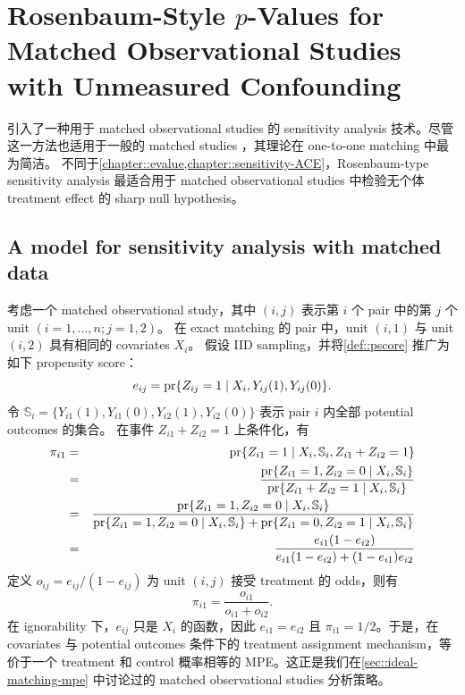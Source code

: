 
\chapter{Rosenbaum-Style $p$-Values for Matched Observational Studies with Unmeasured Confounding}
\label{sec::rosenbaum-sensitivity-analysis}


\citet{rosenbaum1987sensitivity} 引入了一种用于 matched observational studies 的 sensitivity analysis 技术。尽管这一方法也适用于一般的 matched studies \citep{rosenbaum2002design}，其理论在 one-to-one matching 中最为简洁。
不同于\cref{chapter::evalue,chapter::sensitivity-ACE}，Rosenbaum-type sensitivity analysis 最适合用于 matched observational studies 中检验无个体 treatment effect 的 sharp null hypothesis。


\section{A model for sensitivity analysis with matched data}


考虑一个 matched observational study，其中 $(i,j)$ 表示第 $i$ 个 pair 中的第 $j$ 个 unit $(i=1,\ldots, n; j=1,2)$。
在 exact matching 的 pair 中，unit $(i,1)$ 与 unit $(i,2)$ 具有相同的 covariates $X_i$。
假设 IID sampling，并将\cref{def::pscore} 推广为如下 propensity score：
$$
e_{ij} = \textup{pr}\{  Z_{ij} = 1\mid X_i, Y_{ij}(1), Y_{ij}(0) \} .
$$
令 $\mathbb{S}_i = \{Y_{i1}(1), Y_{i1}(0), Y_{i2}(1), Y_{i2}(0)\}$ 表示 pair $i$ 内全部 potential outcomes 的集合。
在事件 $Z_{i1} + Z_{i2} = 1$ 上条件化，有
\begin{eqnarray*}
\pi_{i1} &=& \textup{pr}\{ Z_{i1} = 1 \mid X_i, \mathbb{S}_i, Z_{i1} + Z_{i2} = 1 \} \\
&=& \frac{ \textup{pr}\{ Z_{i1} = 1, Z_{i2} = 0  \mid X_i, \mathbb{S}_i \} }
{ \textup{pr}\{ Z_{i1} + Z_{i2} = 1 \mid X_i, \mathbb{S}_i \} } \\
&=& \frac{ \textup{pr}\{ Z_{i1} = 1, Z_{i2} = 0  \mid X_i, \mathbb{S}_i \} }{ 
\textup{pr}\{ Z_{i1} = 1, Z_{i2} = 0 \mid X_i, \mathbb{S}_i \} + \textup{pr}\{ Z_{i1} = 0, Z_{i2} = 1 \mid X_i, \mathbb{S}_i \}
}\\
&=& \frac{  e_{i1} (1-e_{i2}) }{ e_{i1} (1-e_{i2}) + (1-e_{i1}) e_{i2}} 
\end{eqnarray*}
定义 $o_{ij} = e_{ij} / (1 - e_{ij})$ 为 unit $(i,j)$ 接受 treatment 的 odds，则有
$$
\pi_{i1}  = \frac{o_{i1}}{  o_{i1} + o_{i2} } . 
$$
在 ignorability 下，$e_{ij}$ 只是 $X_i$ 的函数，因此 $e_{i1} = e_{i2}$ 且 $\pi_{i1} = 1/2$。于是，在 covariates 与 potential outcomes 条件下的 treatment assignment mechanism，等价于一个 treatment 和 control 概率相等的 MPE。这正是我们在\cref{sec::ideal-matching-mpe} 中讨论过的 matched observational studies 分析策略。


